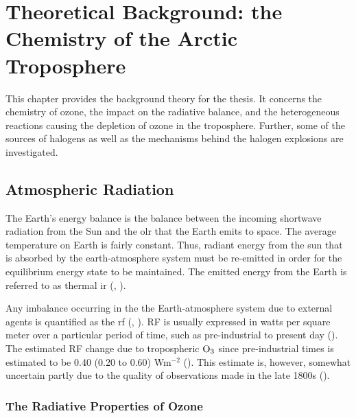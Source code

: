 \setcounter{chapter}{1} 
\chapter{Theoretical Background: the Chemistry of the Arctic Troposphere} \label{ch:theoretical_back}

This chapter provides the background theory for the thesis. It concerns the chemistry of ozone, the impact on the radiative balance, and the heterogeneous reactions causing the depletion of ozone in the troposphere. Further, some of the sources of halogens as well as the mechanisms behind the halogen explosions are investigated. 



\section{Atmospheric Radiation}\label{sec:atm_rad}

The Earth's energy balance is the balance between the incoming shortwave radiation from the Sun and the \acrfull{olr} that the Earth emits to space. The average temperature on Earth is fairly constant. Thus, radiant energy from the sun that is absorbed by the earth-atmosphere system must be re-emitted in order for the equilibrium energy state to be maintained. The emitted energy from the Earth is referred to as thermal \acrfull{ir} (\cite{Liou_AtmRad}, \cite{SeinfeldSpyros}). 

\medskip

Any imbalance occurring in the the Earth-atmosphere system due to external agents is quantified as the \acrfull{rf} (\cite{IPCCchapter8}, \cite{Bowman2013}). RF is usually expressed in watts per square meter over a particular period of time, such as pre-industrial to present day (\cite{IPCCchapter8}). The estimated RF change due to tropospheric $\mathrm{O_3}$ since pre-industrial times is estimated to be 0.40 (0.20 to 0.60) Wm$^{-2}$ (\cite{IPCCchapter8}). This estimate is, however, somewhat uncertain partly due to the quality of observations made in the late 1800s (\cite{Tarasick2019}).


\subsection{The Radiative Properties of Ozone}\label{sec:rad_ozone}

